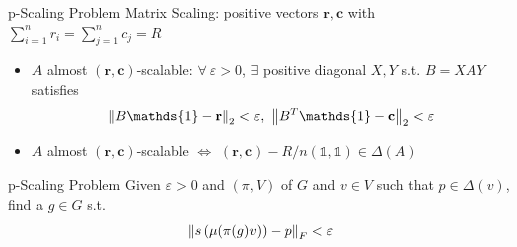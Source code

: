 \documentclass{beamer}
\begin{document}
	\begin{frame}{p-Scaling Problem}
		Matrix Scaling: positive vectors $\mathbf{r},\mathbf{c}$ with $\sum_{i=1}^n r_i = \sum_{j=1}^n c_j =R$
		\begin{itemize}
			\item $A$ almost $(\mathbf{r},\mathbf{c})$-scalable: $\forall~\varepsilon > 0$, $\exists$ positive diagonal $X,Y$ s.t. $B = XAY$ satisfies
			\vspace{-0.5em}
			\begin{equation*}
				\norm{B\mathds{1}- \mathbf{r}}_2 < \varepsilon,~\norm{B^T\mathds{1}- \mathbf{c}}_2 < \varepsilon
				\vspace{-0.5em}
			\end{equation*}
			\item $A$ almost $(\mathbf{r},\mathbf{c})$-scalable $\Leftrightarrow$ $(\mathbf{r},\mathbf{c})-R/n(\mathds{1},\mathds{1}) \in \Delta(A)$
		\end{itemize}
		\begin{block}{p-Scaling Problem}
			Given $\varepsilon > 0$ and $(\pi,V)$ of $G$ and $v \in V$ such that $p \in \Delta(v)$, \\ find a $g \in G$ s.t.
			\vspace{-1em}
			\begin{equation*}
				\norm{s\bc{\mu(\pi(g)v)}-p}_{F} < \varepsilon
				\vspace{0.5em}
			\end{equation*}
		\end{block}
	\end{frame}
\end{document}
